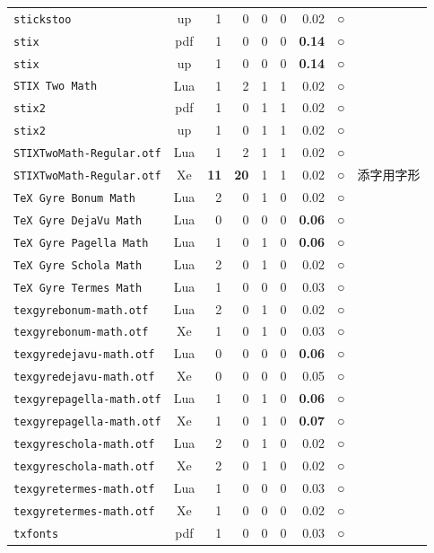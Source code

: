 \begin{longtable}{@{}lcrrrrrcl@{}}
\texttt{stickstoo} & up & 1 & 0 & 0 & 0 & 0.02 & ○ & \\
\texttt{stix} & pdf & 1 & 0 & 0 & 0 & \textbf{0.14} & ○ & \\
\texttt{stix} & up & 1 & 0 & 0 & 0 & \textbf{0.14} & ○ & \\
\texttt{STIX Two Math} & Lua & 1 & 2 & 1 & 1 & 0.02 & ○ & \\
\texttt{stix2} & pdf & 1 & 0 & 1 & 1 & 0.02 & ○ & \\
\texttt{stix2} & up & 1 & 0 & 1 & 1 & 0.02 & ○ & \\
\texttt{STIXTwoMath-Regular.otf} & Lua & 1 & 2 & 1 & 1 & 0.02 & ○ & \\
\texttt{STIXTwoMath-Regular.otf} & Xe & \textbf{11} & \textbf{20} & 1 & 1 & 0.02 & ○ & 添字用字形\\
\texttt{TeX Gyre Bonum Math} & Lua & 2 & 0 & 1 & 0 & 0.02 & ○ & \\
\texttt{TeX Gyre DejaVu Math} & Lua & 0 & 0 & 0 & 0 & \textbf{0.06} & ○ & \\
\texttt{TeX Gyre Pagella Math} & Lua & 1 & 0 & 1 & 0 & \textbf{0.06} & ○ & \\
\texttt{TeX Gyre Schola Math} & Lua & 2 & 0 & 1 & 0 & 0.02 & ○ & \\
\texttt{TeX Gyre Termes Math} & Lua & 1 & 0 & 0 & 0 & 0.03 & ○ & \\
\texttt{texgyrebonum-math.otf} & Lua & 2 & 0 & 1 & 0 & 0.02 & ○ & \\
\texttt{texgyrebonum-math.otf} & Xe & 1 & 0 & 1 & 0 & 0.03 & ○ & \\
\texttt{texgyredejavu-math.otf} & Lua & 0 & 0 & 0 & 0 & \textbf{0.06} & ○ & \\
\texttt{texgyredejavu-math.otf} & Xe & 0 & 0 & 0 & 0 & 0.05 & ○ & \\
\texttt{texgyrepagella-math.otf} & Lua & 1 & 0 & 1 & 0 & \textbf{0.06} & ○ & \\
\texttt{texgyrepagella-math.otf} & Xe & 1 & 0 & 1 & 0 & \textbf{0.07} & ○ & \\
\texttt{texgyreschola-math.otf} & Lua & 2 & 0 & 1 & 0 & 0.02 & ○ & \\
\texttt{texgyreschola-math.otf} & Xe & 2 & 0 & 1 & 0 & 0.02 & ○ & \\
\texttt{texgyretermes-math.otf} & Lua & 1 & 0 & 0 & 0 & 0.03 & ○ & \\
\texttt{texgyretermes-math.otf} & Xe & 1 & 0 & 0 & 0 & 0.02 & ○ & \\
\texttt{txfonts} & pdf & 1 & 0 & 0 & 0 & 0.03 & ○ & \\

\end{longtable}
